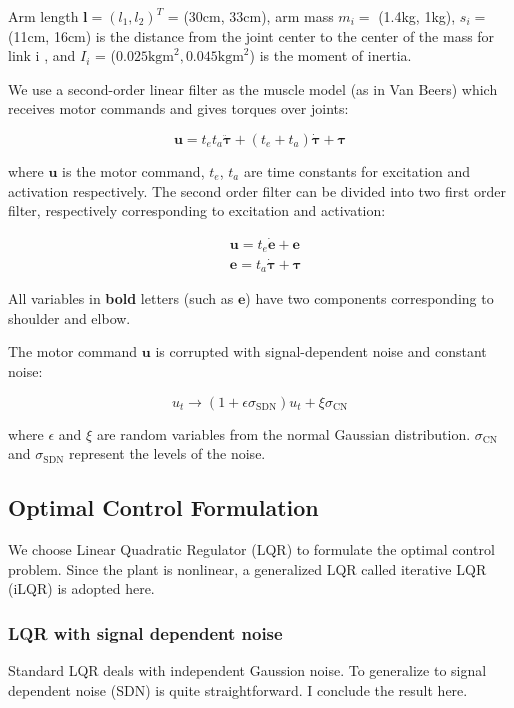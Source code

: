 Arm length $\bm{l} = (l_1, l_2)^T$ = (30cm, 33cm), arm mass $m_i =$ (1.4kg, 1kg), $s_i=$ (11cm, 16cm) is the distance from the joint center to the center of the mass for link i , and $I_i$ = ($0.025\text{kgm}^2, 0.045\text{kgm}^2$) is the moment of inertia.

We use a second-order linear filter as the muscle model (as in Van Beers) which receives motor commands and gives torques over joints:

\begin{equation}
\bm{u} = t_et_a\ddot{\bm{\tau}} + (t_e+t_a)\dot{\bm{\tau}} +\bm{\tau}
\end{equation}

where $\bm{u}$ is the motor command, $t_e$, $t_a$ are time constants for excitation and activation respectively. 
The second order filter can be divided into two first order filter, respectively corresponding to excitation and activation:

\begin{equation}
\begin{split}
& \bm{u} = t_e \dot{\bm{e}} + \bm{e} \\
& \bm{e} = t_a \dot{\bm{\tau}} + \bm{\tau}
\end{split}
\end{equation}

All variables in \textbf{bold} letters (such as $\bm{e}$) have two components corresponding to shoulder and elbow.

The motor command $\bm{u}$ is corrupted with signal-dependent noise and constant noise:

\begin{equation}
u_t \rightarrow (1 + \epsilon\sigma_{\text{SDN}}) u_t + \xi\sigma_{\text{CN}}
\end{equation}

where $\epsilon$ and $\xi$ are random variables from the normal Gaussian distribution.
$\sigma_{\text{CN}}$ and $\sigma_{\text{SDN}}$ represent the levels of the noise.

\subsection{Optimal Control Formulation}
\label{ocformulation}

We choose Linear Quadratic Regulator (LQR) \cite{Li2004} to formulate the optimal control problem. Since the plant is nonlinear, a generalized LQR called iterative LQR (iLQR) is adopted here.

\subsubsection{LQR with signal dependent noise}
Standard LQR deals with independent Gaussion noise. To generalize to signal dependent noise (SDN) is quite straightforward. I conclude the result here.

